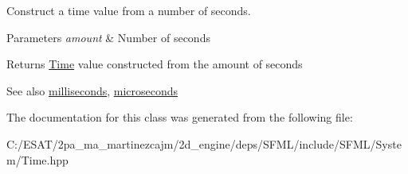 Construct a time value from a number of seconds. 


\begin{DoxyParams}{Parameters}
{\em amount} & Number of seconds\\
\hline
\end{DoxyParams}
\begin{DoxyReturn}{Returns}
\hyperlink{classsf_1_1_time}{Time} value constructed from the amount of seconds
\end{DoxyReturn}
\begin{DoxySeeAlso}{See also}
\hyperlink{classsf_1_1_time_ae379d420bc07170668f51522023957b9}{milliseconds}, \hyperlink{classsf_1_1_time_a951fd7219641f1e8191887f5dfe0dc31}{microseconds} 
\end{DoxySeeAlso}


The documentation for this class was generated from the following file\+:\begin{DoxyCompactItemize}
\item 
C\+:/\+E\+S\+A\+T/2pa\+\_\+ma\+\_\+martinezcajm/2d\+\_\+engine/deps/\+S\+F\+M\+L/include/\+S\+F\+M\+L/\+System/Time.\+hpp\end{DoxyCompactItemize}
